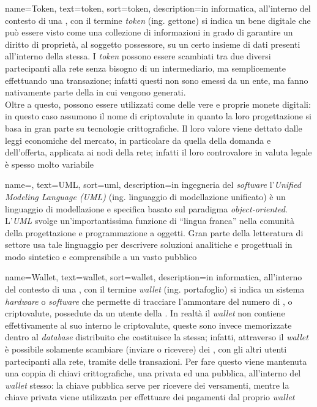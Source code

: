 {
	name=Token,
	text=token,
	sort=token,
	description={in informatica, all'interno del contesto di una , con il termine \emph{token} (ing. gettone) si indica un bene digitale che può essere visto come una collezione di informazioni in grado di garantire un diritto di proprietà, al soggetto possessore, su un certo insieme di dati presenti all'interno della  stessa. I \emph{token} possono essere scambiati tra due diversi partecipanti alla rete senza bisogno di un intermediario, ma semplicemente effettuando una transazione; infatti questi non sono emessi da un ente, ma fanno nativamente parte della  in cui vengono generati.\\
	Oltre a questo, possono essere utilizzati come delle vere e proprie monete digitali: in questo caso assumono il nome di criptovalute in quanto la loro progettazione si basa in gran parte su tecnologie crittografiche. Il loro valore viene dettato dalle leggi economiche del mercato, in particolare da quella della domanda e dell'offerta, applicata ai nodi della rete; infatti il loro controvalore in valuta legale è spesso molto variabile}
}

{
    name=,
    text=UML,
    sort=uml,
    description={in ingegneria del \textit{software} l'\emph{Unified Modeling Language (UML)} (ing. linguaggio di modellazione unificato) è un linguaggio di modellazione e specifica basato sul paradigma \textit{object-oriented}. L'\emph{UML} svolge un'importantissima funzione di ``lingua franca'' nella comunità della progettazione e programmazione a oggetti. Gran parte della letteratura di settore usa tale linguaggio per descrivere soluzioni analitiche e progettuali in modo sintetico e comprensibile a un vasto pubblico}
}

{
	name=Wallet,
	text=wallet,
	sort=wallet,
	description={in informatica, all'interno del contesto di una , con il termine \emph{wallet} (ing. portafoglio) si indica un sistema \textit{hardware} o \textit{software} che permette di tracciare l'ammontare del numero di , o criptovalute, possedute da un utente della . In realtà il \emph{wallet} non contiene effettivamente al suo interno le criptovalute, queste sono invece memorizzate dentro al \textit{database} distribuito che costituisce la  stessa; infatti, attraverso il \emph{wallet} è possibile solamente scambiare (inviare o ricevere) dei , con gli altri utenti partecipanti alla rete, tramite delle transazioni. Per fare questo viene mantenuta una coppia di chiavi crittografiche, una privata ed una pubblica, all'interno del \emph{wallet} stesso: la chiave pubblica serve per ricevere dei versamenti, mentre la chiave privata viene utilizzata per effettuare dei pagamenti dal proprio \emph{wallet}}
}
